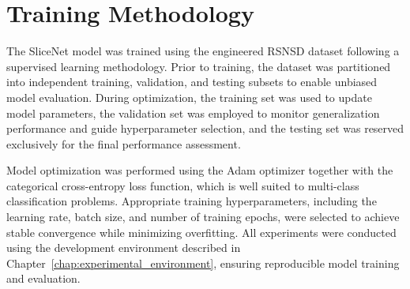 \documentclass[12pt,a4paper]{report}
\begin{document}

	
	\section{Training Methodology}
	\label{sec:training}
	
	The SliceNet model was trained using the engineered RSNSD dataset following a supervised learning methodology. Prior to training, the dataset was partitioned into independent training, validation, and testing subsets to enable unbiased model evaluation. During optimization, the training set was used to update model parameters, the validation set was employed to monitor generalization performance and guide hyperparameter selection, and the testing set was reserved exclusively for the final performance assessment.
	
	Model optimization was performed using the Adam optimizer together with the categorical cross-entropy loss function, which is well suited to multi-class classification problems. Appropriate training hyperparameters, including the learning rate, batch size, and number of training epochs, were selected to achieve stable convergence while minimizing overfitting. All experiments were conducted using the development environment described in Chapter~\ref{chap:experimental_environment}, ensuring reproducible model training and evaluation.
	
\end{document}
